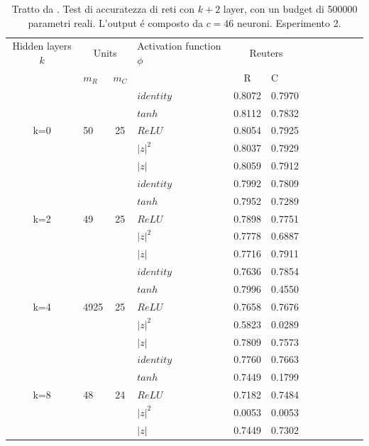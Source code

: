 \documentclass[a4paper,12pt]{report}
\begin{document}
 \begin{table}
  \centering
  \begin{tabular}{cp{} cp{} cp{}   cp{} cp{} cp{}}
   \cline{1-6}
   Hidden layers $k$ & \multicolumn{2}{c}{Units} $p_R$ & Activation function $\phi$ & \multicolumn{2}{c}{Reuters}\\
   \cline{2-3} \cline{5-6}
   & $m_R$ & $m_C$ & & R & C \\
   \cline{1-6}
   & & & $identity$ & 0.8072 & 0.7970 \\
   \cline{4-6}
   & & & $tanh$ & 0.8112 & 0.7832 \\
   \cline{4-6}
   k=0 & 50 & 25 & $ReLU$ & 0.8054 & 0.7925 \\
   \cline{4-6}
   & & & $|z|^2$ & 0.8037 & 0.7929 \\
   \cline{4-6}
   & & & $|z|$ & 0.8059 & 0.7912 \\
   \cline{1-6}
   
   \cline{1-6}
   & & & $identity$ & 0.7992 & 0.7809 \\
   \cline{4-6}
   & & & $tanh$ & 0.7952 & 0.7289 \\
   \cline{4-6}
   k=2 & 49 & 25 & $ReLU$ & 0.7898 & 0.7751 \\
   \cline{4-6}
   & & & $|z|^2$ & 0.7778 & 0.6887 \\
   \cline{4-6}
   & & & $|z|$ & 0.7716 & 0.7911 \\
   \cline{1-6}
   
   \cline{1-6}
   & & & $identity$ & 0.7636 & 0.7854 \\
   \cline{4-6}
   & & & $tanh$ & 0.7996 & 0.4550 \\
   \cline{4-6}
   k=4 & 4925 & 25 & $ReLU$ & 0.7658 & 0.7676 \\
   \cline{4-6}
   & & & $|z|^2$ & 0.5823 & 0.0289 \\
   \cline{4-6}
   & & & $|z|$ & 0.7809 & 0.7573 \\
   \cline{1-6}
   
   \cline{1-6}
   & & & $identity$ & 0.7760 & 0.7663 \\
   \cline{4-6}
   & & & $tanh$ & 0.7449 & 0.1799 \\
   \cline{4-6}
   k=8 & 48 & 24 & $ReLU$ & 0.7182 & 0.7484 \\
   \cline{4-6}
   & & & $|z|^2$ & 0.0053 & 0.0053 \\
   \cline{4-6}
   & & & $|z|$ & 0.7449 & 0.7302 \\
   \cline{1-6}
      
  \end{tabular}
  \caption{Tratto da \cite{monning2018evaluation}. Test di accuratezza di reti con $k+2$ layer, con un budget di 500000 parametri reali. L'output \'e composto da $c=46$ neuroni. Esperimento 2.}
  \label{Reuters2Tab}
 \end{table}
 
\end{document}
